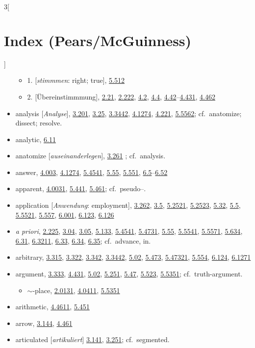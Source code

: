 \documentclass[oneside,openany,12pt]{book}
\newcommand{\indexentry}[1]{\item #1}
\newcommand{\indexsubentry}[1]{\begin{itemize} \item #1 \end{itemize}}
\newcommand{\indexref}[1]{\hyperlink{prop#1}{#1}}
\begin{document}
\begin{multicols}{3}[\section*{Index (Pears/McGuinness)}]
\begin{itemize}
   \indexsubentry{1. [\textit{stimmmen}: right; true], \indexref{5.512}}

   \indexsubentry{2. [\"Ubereinstimmmung], \indexref{2.21}, \indexref{2.222}, \indexref{4.2}, \indexref{4.4}, \indexref{4.42}--\indexref{4.431}, \indexref{4.462}}

\indexentry{analysis [\textit{Analyse}], \indexref{3.201}, \indexref{3.25}, \indexref{3.3442}, \indexref{4.1274}, \indexref{4.221}, \indexref{5.5562}; cf.\ anatomize; dissect; resolve.}

\indexentry{analytic, \indexref{6.11}}

\indexentry{anatomize [\textit{auseinanderlegen}], \indexref{3.261} ; cf.\ analysis.}

\indexentry{answer, \indexref{4.003}, \indexref{4.1274}, \indexref{5.4541}, \indexref{5.55}, \indexref{5.551}, \indexref{6.5}--\indexref{6.52}}

\indexentry{apparent, \indexref{4.0031}, \indexref{5.441}, \indexref{5.461}; cf.\ pseudo--.}

\indexentry{application [\textit{Anwendung}: employment], \indexref{3.262}, \indexref{3.5}, \indexref{5.2521}, \indexref{5.2523}, \indexref{5.32}, \indexref{5.5}, \indexref{5.5521}, \indexref{5.557}, \indexref{6.001}, \indexref{6.123}, \indexref{6.126}}

\indexentry{\textit{a priori}, \indexref{2.225}, \indexref{3.04}, \indexref{3.05}, \indexref{5.133}, \indexref{5.4541}, \indexref{5.4731}, \indexref{5.55}, \indexref{5.5541}, \indexref{5.5571}, \indexref{5.634}, \indexref{6.31}, \indexref{6.3211}, \indexref{6.33}, \indexref{6.34}, \indexref{6.35}; cf.\ advance, in.}

\indexentry{arbitrary, \indexref{3.315}, \indexref{3.322}, \indexref{3.342}, \indexref{3.3442}, \indexref{5.02}, \indexref{5.473}, \indexref{5.47321}, \indexref{5.554}, \indexref{6.124}, \indexref{6.1271} }

\indexentry{argument, \indexref{3.333}, \indexref{4.431}, \indexref{5.02}, \indexref{5.251}, \indexref{5.47}, \indexref{5.523}, \indexref{5.5351}; cf.\ truth-argument.}

   \indexsubentry{$\sim$-place, \indexref{2.0131}, \indexref{4.0411}, \indexref{5.5351}}

\indexentry{arithmetic, \indexref{4.4611}, \indexref{5.451}}

\indexentry{arrow, \indexref{3.144}, \indexref{4.461}}

\indexentry{articulated [\textit{artikuliert}] \indexref{3.141}, \indexref{3.251}; cf.\ segmented.}


\end{itemize}
\end{multicols}
\end{document}
